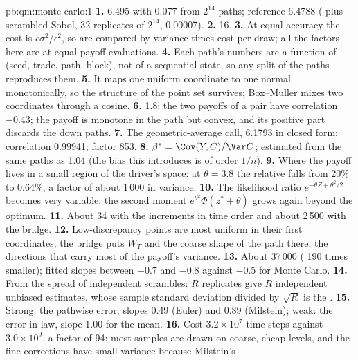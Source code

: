 \begin{solution}{pb:qm:monte-carlo:1}
\textbf{1.} 6.495 with  0.077 from $2^{14}$ paths; reference 6.4788 ( plus scrambled Sobol, 32 replicates of $2^{14}$,  0.00007).
\textbf{2.} 16.
\textbf{3.} At equal accuracy the cost is $c\sigma^2/\epsilon^2$, so  are compared by variance times cost per draw; all the factors here are at equal payoff evaluations.
\textbf{4.} Each path's numbers are a function of (seed, trade, path, block), not of a sequential state, so any split of the paths reproduces them.
\textbf{5.} It maps one uniform coordinate to one normal monotonically, so the structure of the point set survives; Box--Muller mixes two coordinates through a cosine.
\textbf{6.} 1.8: the two payoffs of a pair have correlation $-0.43$; the payoff is monotone in the path but convex, and its positive part discards the down paths.
\textbf{7.} The geometric-average call, 6.1793 in closed form; correlation 0.99941; factor 853.
\textbf{8.} $\beta^* = \Cov(Y, C)/\Var C$; estimated from the same paths as 1.04 (the bias this introduces is of order $1/n$).
\textbf{9.} Where the payoff lives in a small region of the driver's space: at $\theta = 3.8$ the relative  falls from 20\% to 0.64\%, a factor of about 1\,000 in variance.
\textbf{10.} The likelihood ratio $e^{-\theta Z + \theta^2/2}$ becomes very variable: the second moment $e^{\theta^2}\bar\Phi(z^* + \theta)$ grows again beyond the optimum.
\textbf{11.} About 34 with the increments in time order and about 2\,500 with the bridge.
\textbf{12.} Low-discrepancy points are most uniform in their first coordinates; the bridge puts $W_T$ and the coarse shape of the path there, the directions that carry most of the payoff's variance.
\textbf{13.} About 37\,000 ( 190 times smaller); fitted slopes between $-0.7$ and $-0.8$ against $-0.5$ for Monte Carlo.
\textbf{14.} From the spread of independent scrambles: $R$ replicates give $R$ independent unbiased estimates, whose sample standard deviation divided by $\sqrt R$ is the .
\textbf{15.} Strong: the pathwise error, slopes 0.49 (Euler) and 0.89 (Milstein); weak: the error in law, slope 1.00 for the mean.
\textbf{16.} Cost $3.2 \times 10^7$ time steps against $3.0 \times 10^9$, a factor of 94: most samples are drawn on coarse, cheap levels, and the fine corrections have small variance because Milstein's

\end{solution}
